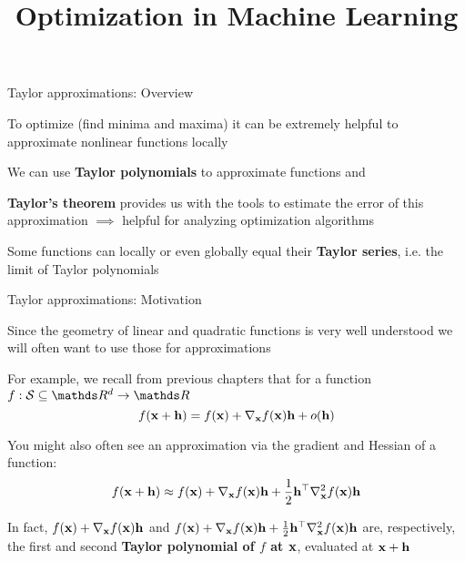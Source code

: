 \documentclass[11pt,compress,t,notes=noshow, xcolor=table]{beamer}
\title{Optimization in Machine Learning}
\begin{document}


\begin{framei}{Taylor approximations: Overview}

    \item To optimize (find minima and maxima) it can be extremely helpful to approximate nonlinear functions locally 
    \item We can use \textbf{Taylor polynomials} to approximate functions and
    \item \textbf{Taylor's theorem} provides us with the tools to estimate the error of this approximation $\implies$ helpful for analyzing optimization algorithms
    \item Some functions can locally or even globally equal their \textbf{Taylor series}, i.e. the limit of Taylor polynomials

{}

\end{framei}


\begin{framei}{Taylor approximations: Motivation}

    \item Since the geometry of linear and quadratic functions is very well understood we will often want to use those for approximations
    \item For example, we recall from previous chapters that for a function $f: \mathcal{S}\subseteq \R^d \to \R$
    $$
    f(\mathbf{x}+\mathbf{h})=f(\mathbf{x})+\nabla_{\mathbf{x}}f(\mathbf{x}) \mathbf{h}+o(\mathbf{h})
    $$
    \item You might also often see an approximation via the gradient and Hessian of a function:
    $$
    f(\mathbf{x}+\mathbf{h})\approx f(\mathbf{x})+\nabla_{\mathbf{x}}f(\mathbf{x}) \mathbf{h}+\frac{1}{2}\mathbf{h}^\top \nabla^2_{\mathbf{x}}f(\mathbf{x}) \mathbf{h}
    $$
    \item In fact, $f(\mathbf{x})+\nabla_{\mathbf{x}}f(\mathbf{x}) \mathbf{h}$ and $f(\mathbf{x})+\nabla_{\mathbf{x}}f(\mathbf{x}) \mathbf{h}+\frac{1}{2}\mathbf{h}^\top \nabla^2_{\mathbf{x}}f(\mathbf{x})\mathbf{h}$ are, respectively, the first and second \textbf{Taylor polynomial of $f$ at $\mathbf{x}$}, evaluated at $\mathbf{x}+\mathbf{h}$
    
\end{framei}
\end{document}
